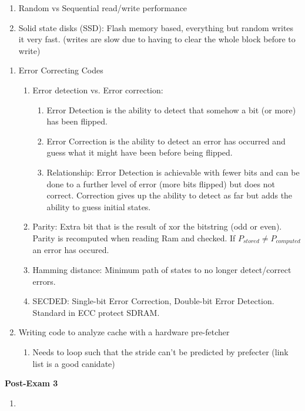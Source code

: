 \documentclass[12pt]{article}
\renewcommand{\=}[1]{\stackrel{#1}{=}} %
\theoremstyle{definition}
\theoremstyle{remark}
\begin{document}
\begin{enumerate}
\begin{enumerate}
    \item Random vs Sequential read/write performance
    \item Solid state disks (SSD): Flash memory based, everything but
      random writes it very fast. (writes are slow due to having to
      clear the whole block before to write)
    \end{enumerate}
    \begin{enumerate}
    \item Error Correcting Codes
      \begin{enumerate}
      \item Error detection vs. Error correction:
        \begin{enumerate}
        \item Error Detection is the ability to detect that somehow a
          bit (or more) has been flipped.
        \item Error Correction is the ability to detect an error has
          occurred and guess what it might have been before being flipped.
        \item Relationship: Error Detection is achievable with fewer
          bits and can be done to a further level of error (more bits
          flipped) but does not correct. Correction gives up the
          ability to detect as far but adds the ability to guess
          initial states.
        \end{enumerate}
      \item Parity: Extra bit that is the result of xor the bitstring
        (odd or even). Parity is recomputed when reading Ram and
        checked. If $P_{stored} \neq P_{computed}$ an error has occured.
      \item Hamming distance: Minimum path of states to no longer
        detect/correct errors.
      \item SECDED: Single-bit Error Correction, Double-bit Error
        Detection. Standard in ECC protect SDRAM.
      \end{enumerate}
    \item Writing code to analyze cache with a hardware pre-fetcher
      \begin{enumerate}
      \item Needs to loop such that the stride can't be predicted by
        prefecter (link list is a good canidate)
      \end{enumerate}
    \end{enumerate}
  \end{enumerate}
  \textbf{Post-Exam 3}
  \begin{enumerate}
  \item 
  \end{enumerate}
\end{document}

